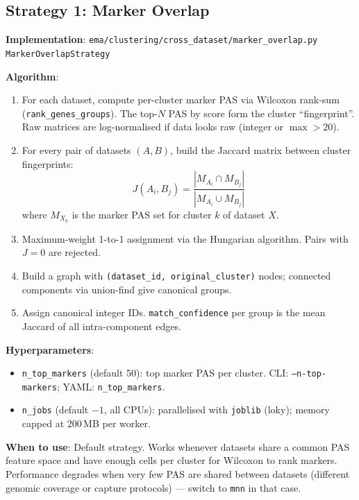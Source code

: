 \documentclass[11pt,a4paper]{article}
\begin{document}
\subsection{Strategy 1: Marker Overlap}
\label{sec:match_marker_overlap}

\textbf{Implementation}: \texttt{ema/clustering/cross\_dataset/marker\_overlap.py}\\
\texttt{MarkerOverlapStrategy}

\textbf{Algorithm}:
\begin{enumerate}
  \item For each dataset, compute per-cluster marker PAS via Wilcoxon
        rank-sum (\texttt{rank\-\_genes\-\_groups}). The top-$N$ PAS by
        score form the cluster ``fingerprint''. Raw matrices are
        log-normalised if data looks raw (integer or $\max > 20$).
  \item For every pair of datasets $(A, B)$, build the Jaccard matrix
        between cluster fingerprints:
        \[
          J(A_i, B_j) = \frac{|M_{A_i} \cap M_{B_j}|}{|M_{A_i} \cup M_{B_j}|}
        \]
        where $M_{X_k}$ is the marker PAS set for cluster $k$ of dataset $X$.
  \item Maximum-weight 1-to-1 assignment via the Hungarian algorithm.
        Pairs with $J = 0$ are rejected.
  \item Build a graph with \texttt{(dataset\_id, original\_cluster)}
        nodes; connected components via union-find give canonical groups.
  \item Assign canonical integer IDs. \texttt{match\_confidence} per
        group is the mean Jaccard of all intra-component edges.
\end{enumerate}

\textbf{Hyperparameters}:
\begin{itemize}
  \item \texttt{n\_top\_markers} (default 50): top marker PAS per cluster.
        CLI: \texttt{--n-top-markers}; YAML: \texttt{n\_top\_markers}.
  \item \texttt{n\_jobs} (default $-1$, all CPUs): parallelised with
        \texttt{joblib} (loky); memory capped at 200\,MB per worker.
\end{itemize}

\textbf{When to use}: Default strategy. Works whenever datasets share a common PAS
feature space and have enough cells per cluster for Wilcoxon to rank markers.
Performance degrades when very few PAS are shared between datasets (different genomic
coverage or capture protocols) --- switch to \texttt{mnn} in that case.
\end{document}
